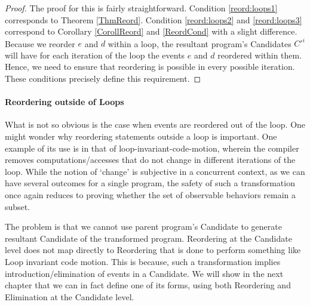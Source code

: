         \begin{proof}
        
            The proof for this is fairly straightforward. 
            Condition \ref{reord:loops1} corresponds to Theorem \ref{ThmReord}. 
            Condition \ref{reord:loops2} and \ref{reord:loops3} correspond to Corollary \ref{CorollReord} and \ref{ReordCond} with a slight difference. 
            Because we reorder $e$ and $d$ within a loop, the resultant program's Candidates $C'^i$ will have for each iteration of the loop the events $e$ and $d$ reordered within them. 
            Hence, we need to ensure that reordering is possible in every possible iteration. 
            These conditions precisely define this requirement\footnotemark. 
            

        \end{proof}

        \paragraph{Reordering outside of Loops}

            What is not so obvious is the case when events are reordered out of the loop. 
            One might wonder why reordering statements outside a loop is important. 
            One example of its use is in that of loop-invariant-code-motion\cite{Muchnick}, wherein the compiler removes computations/accesses that do not change in different iterations of the loop. 
            While the notion of `change' is subjective in a concurrent context, as we can have several outcomes for a single program, the safety of such a transformation once again reduces to proving whether the set of observable behaviors remain a subset. 
             
            The problem is that we cannot use parent program's Candidate to generate resultant Candidate of the transformed program. 
            Reordering at the Candidate level does not map directly to Reordering that is done to perform something like Loop invariant code motion. 
            This is because, such a transformation implies introduction/elimination of events in a Candidate.
            We will show in the next chapter that we can in fact define one of its forms, using both Reordering and Elimination at the Candidate level.

           
    